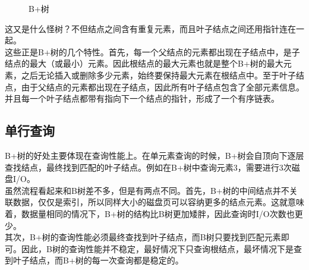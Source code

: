 \begin{figure}[H]
	\centering
	\caption{B+树}
\end{figure}

这又是什么怪树？不但结点之间含有重复元素，而且叶子结点之间还用指针连在一起。\\

这些正是B+树的几个特性。首先，每一个父结点的元素都出现在子结点中，是子结点的最大（或最小）元素。因此根结点的最大元素也就是整个B+树的最大元素，之后无论插入或删除多少元素，始终要保持最大元素在根结点中。至于叶子结点，由于父结点的元素都出现在子结点，因此所有叶子结点包含了全部元素信息。并且每一个叶子结点都带有指向下一个结点的指针，形成了一个有序链表。\\

\subsection{单行查询}

B+树的好处主要体现在查询性能上。在单元素查询的时候，B+树会自顶向下逐层查找结点，最终找到匹配的叶子结点。例如在B+树中查询元素3，需要进行3次磁盘I/O。\\

虽然流程看起来和B树差不多，但是有两点不同。首先，B+树的中间结点并不关联数据，仅仅是索引，所以同样大小的磁盘页可以容纳更多的结点元素。这就意味着，数据量相同的情况下，B+树的结构比B树更加矮胖，因此查询时I/O次数也更少。\\

其次，B+树的查询性能必须最终查找到叶子结点，而B树只要找到匹配元素即可。因此，B树的查询性能并不稳定，最好情况下只查询根结点，最坏情况下是查到叶子结点，而B+树的每一次查询都是稳定的。\\

